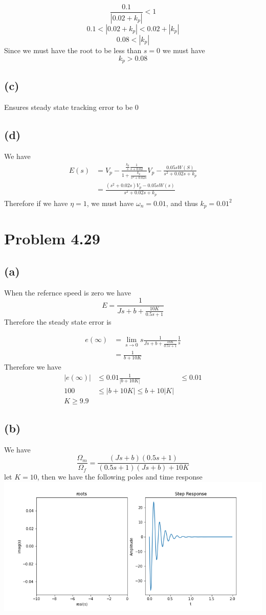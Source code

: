 \documentclass[12pt]{article}
\begin{document}
$$\frac{0.1}{|0.02+k_p|}<1$$
$$0.1<|0.02+k_p|<0.02+|k_p|$$
$$0.08<|k_p|$$
Since we must have the root to be less than $s=0$ we must have
$$\boxed{k_p>0.08}$$
\subsection*{(c)}
Ensures steady state tracking error to be $0$
\subsection*{(d)}
We have
\begin{align*}
    E(s)&=V_p-\frac{\frac{k_p}{s}\frac{1}{s+0.02}}{1+\frac{k_p}{s^2+0.02s}}
V_p-\frac{0.05sW(S)}{s^2+0.02s+k_p}\\
&=\frac{(s^2+0.02s)V_p-0.05sW(s)}{s^2+0.02s+k_p}
\end{align*}
Therefore if we have $\eta=1$, we must have $\omega_n=0.01$, and thus $\boxed{k_p=0.01^2}$
\section*{Problem 4.29}
\subsection*{(a)}
When the refernce speed is zero we have
$$E=\frac{1}{Js+b+\frac{10K}{0.5s+1}}$$
Therefore the steady state error is

\begin{align*}
    e(\infty)&=\lim_{s\to0}s\frac{1}{Js+b+\frac{10K}{0.5s+1}}\frac{1}{s}\\
    &=\frac{1}{b+10K}
\end{align*}
Therefore we have
\begin{align*}
    |e(\infty)|&\leq 0.01
    \frac{1}{|b+10K|}&\leq 0.01\\
    100&\leq|b+10K|\leq b+10|K|\\
    \boxed{K\geq 9.9}
\end{align*}
\subsection*{(b)}
We have
$$\frac{\Omega_m}{\Omega_f}=\frac{(Js+b)(0.5s+1)}{(0.5s+1)(Js+b)+10K}$$
let $K=10$, then we have the following poles and time response
\includegraphics[scale=0.5]{fig1}
\FloatBarrier
\end{document}

